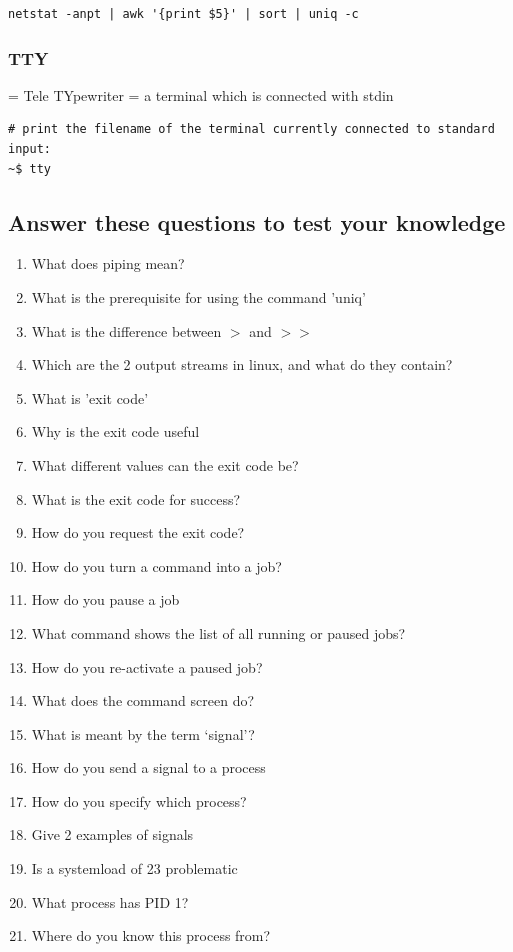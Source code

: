 \documentclass{article}
\begin{document}
\begin{verbatim}
netstat -anpt | awk '{print $5}' | sort | uniq -c
\end{verbatim}

\subsubsection{TTY}

= Tele TYpewriter
= a terminal which is connected with stdin

\begin{verbatim}
# print the filename of the terminal currently connected to standard input:
~$ tty
\end{verbatim}

\subsection{Answer these questions to test your knowledge}

\begin{enumerate}
    \item What does piping mean?
    \item What is the prerequisite for using the command 'uniq'
    \item What is the difference between $>$ and $>>$
    \item Which are the 2 output streams in linux, and what do they contain?
    \item What is 'exit code'
    \item Why is the exit code useful
    \item What different values can the exit code be?
    \item What is the exit code for success?
    \item How do you request the exit code?
    \item How do you turn a command into a job?
    \item How do you pause a job
    \item What command shows the list of all running or paused jobs?
    \item How do you re-activate a paused job?
    \item What does the command screen do?
    \item What is meant by the term `signal'?
    \item How do you send a signal to a process
    \item How do you specify which process?
    \item Give 2 examples of signals
    \item Is a systemload of 23 problematic
    \item What process has PID 1?
    \item Where do you know this process from?
\end{enumerate}
\end{document}
